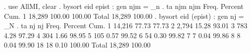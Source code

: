 . use AllMI, clear
{\smallskip}
. bysort eid epist : gen njm = _n
{\smallskip}
. ta njm
{\smallskip}
        njm {\VBAR}      Freq.     Percent        Cum.
          1 {\VBAR}     18,289      100.00      100.00
      Total {\VBAR}     18,289      100.00
{\smallskip}
. bysort eid (epist) : gen nj = _N
{\smallskip}
. ta nj
{\smallskip}
         nj {\VBAR}      Freq.     Percent        Cum.
          1 {\VBAR}     14,216       77.73       77.73
          2 {\VBAR}      2,794       15.28       93.01
          3 {\VBAR}        783        4.28       97.29
          4 {\VBAR}        304        1.66       98.95
          5 {\VBAR}        105        0.57       99.52
          6 {\VBAR}         54        0.30       99.82
          7 {\VBAR}          7        0.04       99.86
          8 {\VBAR}          8        0.04       99.90
         18 {\VBAR}         18        0.10      100.00
      Total {\VBAR}     18,289      100.00
{\smallskip}
